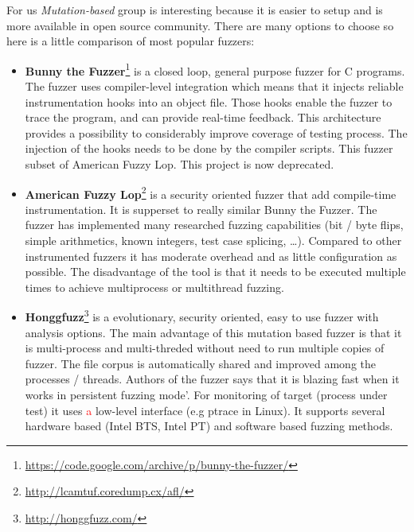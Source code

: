 For us \emph{Mutation-based} group is interesting because it is easier to setup and
is more available in open source community. There are many options to choose so here is
a little comparison of most popular fuzzers:

\begin{itemize}

	\item \textbf{Bunny the Fuzzer}\footnote{\url{https://code.google.com/archive/p/bunny-the-fuzzer/}} is a closed loop, general purpose fuzzer for C programs.
	The fuzzer uses compiler-level integration which means that it injects reliable instrumentation hooks into an object file.
	Those hooks enable the fuzzer to trace the program, and can provide real-time feedback. This architecture provides a possibility
	to considerably improve coverage of testing process. The injection of the hooks
	needs to be done by the compiler scripts.
	This fuzzer subset of American Fuzzy Lop. This project is now deprecated.

	\item \textbf{American Fuzzy Lop}\footnote{\url{http://lcamtuf.coredump.cx/afl/}}
	is a security oriented fuzzer that add compile-time instrumentation. It is
	supperset to really similar Bunny the Fuzzer. The fuzzer has implemented many
	researched fuzzing capabilities (bit / byte flips,  simple arithmetics, known
	integers, test case splicing, \ldots). Compared to other instrumented fuzzers it
	has moderate overhead and as little configuration as possible. The disadvantage
	of the tool is that it needs to be executed multiple times to achieve
	multiprocess or multithread fuzzing.

	\item \textbf{Honggfuzz}\footnote{\url{http://honggfuzz.com/}} is a evolutionary, security oriented, easy to use fuzzer with analysis options.
	The main advantage of this mutation based fuzzer is that it is multi-process and multi-threded without need to run multiple copies of fuzzer.
	The file corpus is automatically shared and improved among the processes / threads.
	Authors of the fuzzer says that it is blazing fast when it works in persistent fuzzing mode'.
	For monitoring of target (process under test) it uses {\textcolor{red}{a}} low-level interface (e.g ptrace in Linux).
	It supports several hardware based (Intel BTS, Intel PT) and software based fuzzing methods.


\end{itemize}
